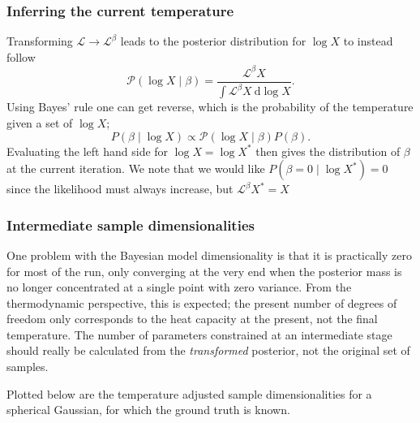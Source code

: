 \documentclass[usenatbib]{mnras}
\newcommand{\Like}{\mathcal{L}}
\begin{document}
\subsubsection*{Inferring the current temperature}
Transforming $\mathcal{L} \to \Like^{\beta}$ leads to the posterior distribution for $\log X$ to instead follow
\begin{equation}
    \mathcal{P}\left(\log X \mid \beta\right) = \frac{\Like^{\beta} X}{\int \Like^{\beta} X \ \mathrm{d}\log X}.
\end{equation}
Using Bayes' rule one can get reverse, which is the probability of the temperature given a set of $\log X$;
\begin{equation}
    P\left(\beta \mid \log X\right) \propto \mathcal{P}\left(\log X \mid \beta\right)P\left(\beta\right).
\end{equation}
Evaluating the left hand side for $\log X = \log X^{*}$ then gives the distribution of $\beta$ at the current iteration. We note that we would like $P\left(\beta = 0 \mid \log X^{*}\right) = 0$ since the likelihood must always increase, but $\Like^{\beta} X^{*} = X^{}$  


\subsubsection*{Intermediate sample dimensionalities}
One problem with the Bayesian model dimensionality is that it is practically zero for most of the run, only converging at the very end when the posterior mass is no longer concentrated at a single point with zero variance. From the thermodynamic perspective, this is expected; the present number of degrees of freedom only corresponds to the heat capacity at the present, not the final temperature. The number of parameters constrained at an intermediate stage should really be calculated from the \textit{transformed} posterior, not the original set of samples.
\par
Plotted below are the temperature adjusted sample dimensionalities for a spherical Gaussian, for which the ground truth is known. 
\end{document}
